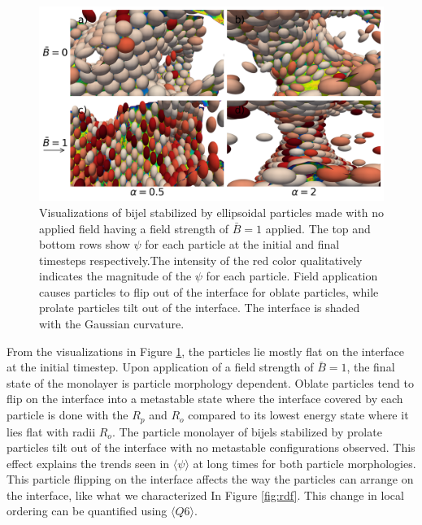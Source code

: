 \begin{figure} 
    \centering 
    \includegraphics[scale=0.4]{../figures/results/paper2/psi_concat_startB-0_endB-1.png} 
    \caption{Visualizations of bijel stabilized by ellipsoidal particles made with no applied field having a field strength of $\bar{B} = 1$ applied. The top and bottom 
             rows show $\psi$ for each particle at the initial and final timesteps respectively.The intensity
             of the red color qualitatively indicates the magnitude of the $\psi$ for each particle. Field application causes particles to flip out of the interface for
             oblate particles, while prolate particles tilt out of the interface. The interface is shaded with the Gaussian curvature.} 
    \label{fig:psi_field_on_visualize} 
\end{figure}

From the visualizations in Figure \ref{fig:psi_field_on_visualize}, the particles lie mostly flat on the interface at the initial timestep. Upon application of a field 
strength of $\bar{B} = 1$, the final state of the monolayer is particle morphology dependent. Oblate particles tend to flip on the interface into a metastable state where
the interface covered by each particle is done with the $R_p$ and $R_o$ compared to its lowest energy state where it lies flat with radii $R_o$. The particle monolayer
of bijels stabilized by prolate particles tilt out of the interface with no metastable configurations observed. This effect explains the trends seen in $\langle \psi \rangle$
at long times for both particle morphologies. This particle flipping on the interface affects the way the particles can arrange on the interface, like what we 
characterized In Figure \ref{fig:rdf}. This change in local ordering can be quantified using $\langle Q6 \rangle$.

